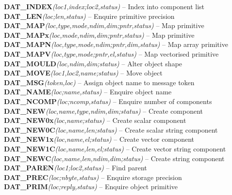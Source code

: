 \documentclass[11pt]{article}
\newcommand{\htmlref}[2]{#1}
\newcommand{\st}[1]{{\em{#1}}}
\begin{document}
{\bf \htmlref{DAT\_INDEX}{DAT_INDEX}}\st{(loc1,index;loc2,status)} -- Index into component list \\
{\bf \htmlref{DAT\_LEN}{DAT_LEN}}\st{(loc;len,status)} -- Enquire primitive precision \\
{\bf \htmlref{DAT\_MAP}{DAT_MAP}}\st{(loc,type,mode,ndim,dim;pntr,status)} -- Map primitive \\
{\bf \htmlref{DAT\_MAPx}{DAT_MAPx}}\st{(loc,mode,ndim,dim;pntr,status)} -- Map primitive \\
{\bf \htmlref{DAT\_MAPN}{DAT_MAPN}}\st{(loc,type,mode,ndim;pntr,dim,status)} -- Map array primitive\\
{\bf \htmlref{DAT\_MAPV}{DAT_MAPV}}\st{(loc,type,mode;pntr,el,status)} -- Map vectorised primitive\\
{\bf \htmlref{DAT\_MOULD}{DAT_MOULD}}\st{(loc,ndim,dim;status)} -- Alter object shape \\
{\bf \htmlref{DAT\_MOVE}{DAT_MOVE}}\st{(loc1,loc2,name;status)} -- Move object \\
{\bf \htmlref{DAT\_MSG}{DAT_MSG}}\st{(token,loc)} -- Assign object name to message token \\
{\bf \htmlref{DAT\_NAME}{DAT_NAME}}\st{(loc;name,status)} -- Enquire object name \\
{\bf \htmlref{DAT\_NCOMP}{DAT_NCOMP}}\st{(loc;ncomp,status)} -- Enquire number of components \\
{\bf \htmlref{DAT\_NEW}{DAT_NEW}}\st{(loc,name,type,ndim,dim;status)} -- Create component \\
{\bf \htmlref{DAT\_NEW0x}{DAT_NEW0x}}\st{(loc,name;status)} -- Create scalar component\\
{\bf \htmlref{DAT\_NEW0C}{DAT_NEW0C}}\st{(loc,name,len;status)} -- Create scalar string component\\
{\bf \htmlref{DAT\_NEW1x}{DAT_NEW1x}}\st{(loc,name,el;status)} -- Create vector component\\
{\bf \htmlref{DAT\_NEW1C}{DAT_NEW1C}}\st{(loc,name,len,el;status)} -- Create vector string component\\
{\bf \htmlref{DAT\_NEWC}{DAT_NEWC}}\st{(loc,name,len,ndim,dim;status)} -- Create string component\\
{\bf \htmlref{DAT\_PAREN}{DAT_PAREN}}\st{(loc1;loc2,status)} -- Find parent \\
{\bf \htmlref{DAT\_PREC}{DAT_PREC}}\st{(loc;nbyte,status)} -- Enquire storage precision\\
{\bf \htmlref{DAT\_PRIM}{DAT_PRIM}}\st{(loc;reply,status)} -- Enquire object primitive \\
\end{document}
